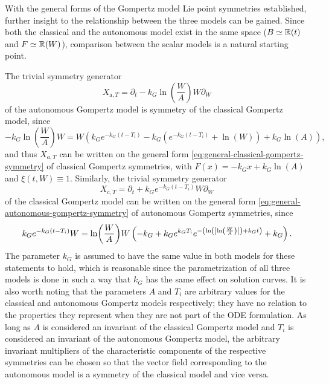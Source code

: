With the general forms of the Gompertz model Lie point symmetries established, further insight to the relationship between the three models can be gained.
Since both the classical and the autonomous model exist in the same space (\(B \simeq \mathbb{R}(t)\) and \(F \simeq \mathbb{R}(W)\)), comparison between the scalar models is a natural starting point.

The trivial symmetry generator
\begin{equation}
  X_{\text{a},T} = \partial_t - k_G \ln(\frac{W}{A}) W \partial_W
\end{equation}
of the autonomous Gompertz model is symmetry of the classical Gompertz model, since
\begin{equation}
  -k_G \ln(\frac{W}{A}) W = W \left(k_G e^{-k_G (t - T_i)} - k_G \left(e^{-k_G (t - T_i)} + \ln(W)\right) + k_G \ln(A)\right),
\end{equation}
and thus \(X_{a,T}\) can be written on the general form \cref{eq:general-classical-gompertz-symmetry} of classical Gompertz symmetries, with \(F(x) = -k_G x + k_G \ln(A)\) and \(\xi(t, W) \equiv 1\).
Similarly, the trivial symmetry generator
\begin{equation}
  X_{\text{c},T} = \partial_t + k_G e^{-k_G (t - T_i)} W \partial_W
\end{equation}
of the classical Gompertz model can be written on the general form \cref{eq:general-autonomous-gompertz-symmetry} of autonomous Gompertz symmetries, since
\begin{equation}
  k_G e^{-k_G (t - T_i)} W = \ln(\frac{W}{A}) W \left(-k_G + k_G e^{k_G T_i} e^{-\left(\ln(\abs{\ln(\frac{W}{A})}) + k_G t\right)} + k_G\right). %
\end{equation}
The parameter \(k_G\) is assumed to have the same value in both models for these statements to hold, which is reasonable since the parametrization of all three models is done in such a way that \(k_G\) has the same effect on solution curves.
It is also worth noting that the parameters \(A\) and \(T_i\) are arbitrary values for the classical and autonomous Gompertz models respectively; they have no relation to the properties they represent when they are not part of the ODE formulation.
As long as \(A\) is considered an invariant of the classical Gompertz model and \(T_i\) is considered an invariant of the autonomous Gompertz model, the arbitrary invariant multipliers of the characteristic components of the respective symmetries can be chosen so that the vector field corresponding to the autonomous model is a symmetry of the classical model and vice versa.

